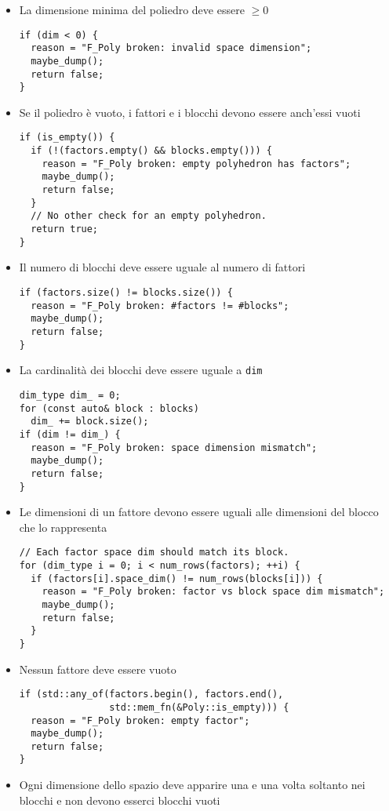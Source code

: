 \documentclass{mimosis}
\theoremstyle{definition}
\begin{document}
\begin{itemize}
\item La dimensione minima del poliedro deve essere \(\ge 0\)
\begin{verbatim}
if (dim < 0) {
  reason = "F_Poly broken: invalid space dimension";
  maybe_dump();
  return false;
}
\end{verbatim}
\item Se il poliedro è vuoto, i fattori e i blocchi devono essere anch'essi vuoti
\begin{verbatim}
if (is_empty()) {
  if (!(factors.empty() && blocks.empty())) {
    reason = "F_Poly broken: empty polyhedron has factors";
    maybe_dump();
    return false;
  }
  // No other check for an empty polyhedron.
  return true;
}
\end{verbatim}
\item Il numero di blocchi deve essere uguale al numero di fattori
\begin{verbatim}
if (factors.size() != blocks.size()) {
  reason = "F_Poly broken: #factors != #blocks";
  maybe_dump();
  return false;
}
\end{verbatim}
\item La cardinalità dei blocchi deve essere uguale a \texttt{dim}
\begin{verbatim}
dim_type dim_ = 0;
for (const auto& block : blocks)
  dim_ += block.size();
if (dim != dim_) {
  reason = "F_Poly broken: space dimension mismatch";
  maybe_dump();
  return false;
}
\end{verbatim}
\item Le dimensioni di un fattore devono essere uguali alle dimensioni del blocco
che lo rappresenta
\begin{verbatim}
// Each factor space dim should match its block.
for (dim_type i = 0; i < num_rows(factors); ++i) {
  if (factors[i].space_dim() != num_rows(blocks[i])) {
    reason = "F_Poly broken: factor vs block space dim mismatch";
    maybe_dump();
    return false;
  }
}
\end{verbatim}
\item Nessun fattore deve essere vuoto
\begin{verbatim}
if (std::any_of(factors.begin(), factors.end(),
                std::mem_fn(&Poly::is_empty))) {
  reason = "F_Poly broken: empty factor";
  maybe_dump();
  return false;
}
\end{verbatim}
\item Ogni dimensione dello spazio deve apparire una e una volta soltanto nei
blocchi e non devono esserci blocchi vuoti

\end{itemize}
\end{document}
